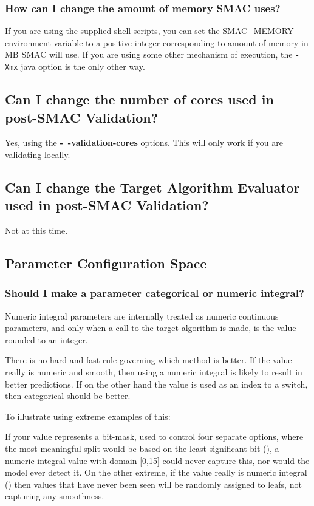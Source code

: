 \documentclass[11pt,letterpaper,oneside]{article}
\begin{document}
\subsubsection{How can I change the amount of memory SMAC uses?}

If you are using the supplied shell scripts, you can set the SMAC\_MEMORY environment variable to a positive integer corresponding to amount of memory in MB SMAC will use. If you are using some other mechanism of execution, the \texttt{-Xmx} java option is the only other way.

\subsection{Can I change the number of cores used in post-SMAC Validation?}

Yes, using the \textbf{-~$\!$-validation-cores} options. This will only work
if you are validating locally.

\subsection{Can I change the Target Algorithm Evaluator used in post-SMAC Validation?}

Not at this time.

\subsection{Parameter Configuration Space}

\subsubsection{Should I make a parameter categorical or numeric integral?}

	Numeric integral parameters are internally treated as numeric continuous parameters, and only when a call to the target algorithm is made, is the value rounded to an integer. 
	
	There is no hard and fast rule governing which method is better. If the value really is numeric and smooth, then using a numeric integral is likely to result in better predictions. If on the other hand the value is used as an index to a switch, then categorical should be better.
	
	To illustrate using extreme examples of this:
	
	If your value represents a bit-mask, used to control four separate options, where the most meaningful split would be based on the least significant bit (), a numeric integral value with domain [0,15] could never capture this, nor would the model ever detect it. On the other extreme, if the value really is numeric integral (\eg{[0, 1024]}) then values that have never been seen will be randomly assigned to leafs, not capturing any smoothness.
		
\end{document}
